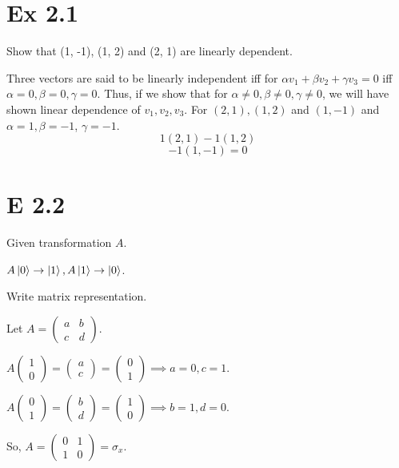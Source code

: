 \documentclass{article}
\newcommand{\0}{{$|0\rangle$}}
\newcommand{\1}{{$|1\rangle$}}
\begin{document}
\section*{Ex 2.1}
Show that (1, -1), (1, 2)
and (2, 1) are linearly
dependent.

Three vectors are said
to be linearly independent iff
for $\alpha v_1 + \beta v_2 + \gamma v_3=0$
iff $\alpha=0, \beta=0, \gamma=0$.
Thus, if we show
that for $\alpha \ne 0, \beta \ne 0, \gamma \ne 0$,
we will have shown
linear dependence of
$v_1, v_2, v_3$.
For $(2, 1), (1, 2)$ and
$(1, -1)$ and $\alpha=1, \beta=-1$,
$\gamma=-1$.
$$
1(2, 1) - 1(1, 2)
$$
$$
-1(1, -1) = 0
$$

\newpage
\section*{E 2.2}

Given transformation $A$. 

$A\ket{0} \to \ket{1}, A\ket{1} \to \ket{0}$. 

Write matrix representation. 

Let $A = \begin{pmatrix} a & b \\ c & d \end{pmatrix}$. 

$A\begin{pmatrix} 1 \\ 0 \end{pmatrix} = \begin{pmatrix} a \\ c \end{pmatrix} = \begin{pmatrix} 0 \\ 1 \end{pmatrix} \implies a=0, c=1$. 

$A\begin{pmatrix} 0 \\ 1 \end{pmatrix} = \begin{pmatrix} b \\ d \end{pmatrix} = \begin{pmatrix} 1 \\ 0 \end{pmatrix} \implies b=1, d=0$. 

So, $A = \begin{pmatrix} 0 & 1 \\ 1 & 0 \end{pmatrix} = \sigma_x$. 
\end{document}
